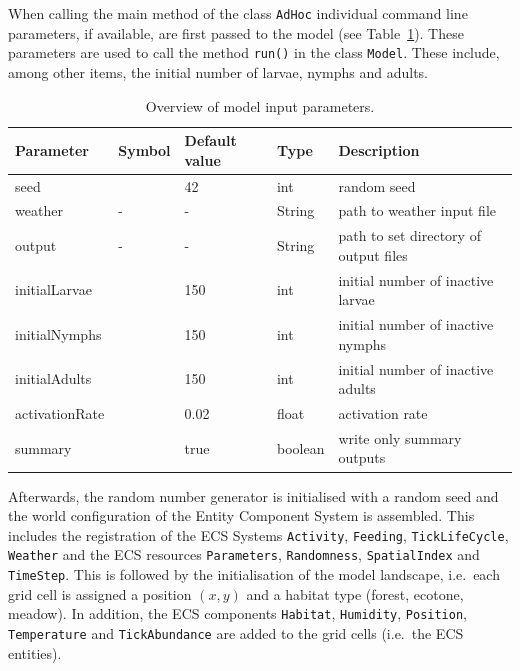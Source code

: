 \documentclass[a4paper, 11pt]{scrartcl}
\newcommand{\inlinecode}[1]{\texttt{\small #1}}
\begin{document}
When calling the main method of the class \inlinecode{AdHoc} individual command line parameters, if available, are first passed to the model (see Table~\ref{tab:initialisation_parameters}). These parameters are used to call the method \inlinecode{run()} in the class \inlinecode{Model}. These include, among other items, the initial number of larvae, nymphs and adults.

\begin{table}[h!]
\caption[Overview of model input parameters.]{Overview of model input parameters.}
\label{tab:initialisation_parameters}
\begin{tabularx}{\textwidth}{lllll}
\toprule
\textbf{Parameter} 	& \textbf{Symbol} & \textbf{Default value} & \textbf{Type} & \textbf{Description} \\
\midrule
seed    			&   & 42    & int     & random seed \\
weather     		& - & -     & String  & path to weather input file \\
output     			& - & -     & String  & path to set directory of output files \\
initialLarvae       &   & 150   & int     & initial number of inactive larvae \\
initialNymphs       &   & 150   & int     & initial number of inactive nymphs \\
initialAdults       &   & 150   & int     & initial number of inactive adults \\
activationRate      &   & 0.02  & float   & activation rate  \\
summary       		&   & true & boolean & write only summary outputs \\
\bottomrule
\end{tabularx}
\end{table}

Afterwards, the random number generator is initialised with a random seed and the world configuration of the Entity Component System is assembled. This includes the registration of the ECS Systems \inlinecode{Activity}, \inlinecode{Feeding}, \inlinecode{TickLifeCycle}, \inlinecode{Weather} and the ECS resources \inlinecode{Parameters}, \inlinecode{Randomness}, \inlinecode{SpatialIndex} and \inlinecode{TimeStep}. This is followed by the initialisation of the model landscape, i.e.\ each grid cell is assigned a position $(x, y)$ and a habitat type (forest, ecotone, meadow). In addition, the ECS components \inlinecode{Habitat}, \inlinecode{Humidity}, \inlinecode{Position}, \inlinecode{Temperature} and \inlinecode{TickAbundance} are added to the grid cells (i.e.\ the ECS entities).
\end{document}
